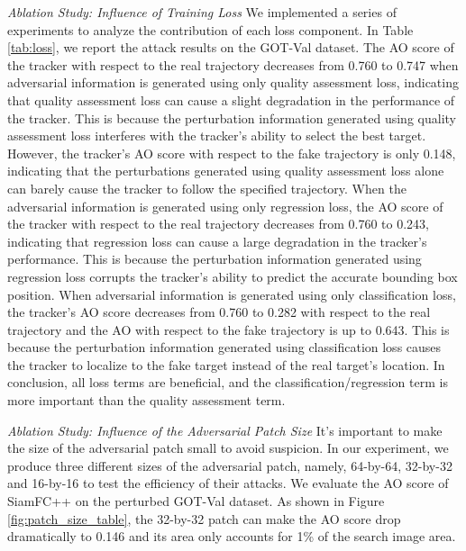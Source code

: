 \documentclass[journal]{IEEEtran}
\begin{document}
\textit{Ablation Study: Influence of Training Loss} We implemented a series of experiments to analyze the contribution of each loss component. In Table \ref{tab:loss}, we report the attack results on the GOT-Val dataset. The AO score of the tracker with respect to the real trajectory decreases from 0.760 to 0.747 when adversarial information is generated using only quality assessment loss, indicating that quality assessment loss can cause a slight degradation in the performance of the tracker. This is because the perturbation information generated using quality assessment loss interferes with the tracker's ability to select the best target. However, the tracker's AO score with respect to the fake trajectory is only 0.148, indicating that the perturbations generated using quality assessment loss alone can barely cause the tracker to follow the specified trajectory. When the adversarial information is generated using only regression loss, the AO score of the tracker with respect to the real trajectory decreases from 0.760 to 0.243, indicating that regression loss can cause a large degradation in the tracker's performance. This is because the perturbation information generated using regression loss corrupts the tracker's ability to predict the accurate bounding box position. When adversarial information is generated using only classification loss, the tracker's AO score decreases from 0.760 to 0.282 with respect to the real trajectory and the AO with respect to the fake trajectory is up to 0.643. This is because the perturbation information generated using classification loss causes the tracker to localize to the fake target instead of the real target's location. In conclusion, all loss terms are beneficial, and the classification/regression term is more important than the quality assessment term.

\textit{Ablation Study: Influence of the Adversarial Patch Size} 
It's important to make the size of the adversarial patch small to avoid suspicion. In our experiment, we produce three different sizes of the adversarial patch, namely, 64-by-64, 32-by-32 and 16-by-16 to test the efficiency of their attacks. We evaluate the AO score of SiamFC++ on the perturbed GOT-Val dataset.
As shown in Figure \ref{fig:patch_size_table}, the 32-by-32 patch can make the AO score drop dramatically to 0.146 and its area only accounts for 1\% of the search image area.
\end{document}

